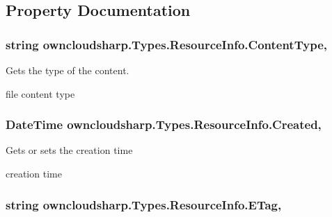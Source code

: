 \subsection{Property Documentation}
\hypertarget{classowncloudsharp_1_1_types_1_1_resource_info_a630004ab07e631b1b72a13388b2fb656}{}
\subsubsection[{Content\+Type}]{\setlength{\rightskip}{0pt plus 5cm}string owncloudsharp.\+Types.\+Resource\+Info.\+Content\+Type\hspace{0.3cm}{\ttfamily [get]}, {\ttfamily [set]}}\label{classowncloudsharp_1_1_types_1_1_resource_info_a630004ab07e631b1b72a13388b2fb656}


Gets the type of the content. 

file content type\hypertarget{classowncloudsharp_1_1_types_1_1_resource_info_a663b8a81ceec10d43e82892f792e256c}{}
\subsubsection[{Created}]{\setlength{\rightskip}{0pt plus 5cm}Date\+Time owncloudsharp.\+Types.\+Resource\+Info.\+Created\hspace{0.3cm}{\ttfamily [get]}, {\ttfamily [set]}}\label{classowncloudsharp_1_1_types_1_1_resource_info_a663b8a81ceec10d43e82892f792e256c}


Gets or sets the creation time 

creation time\hypertarget{classowncloudsharp_1_1_types_1_1_resource_info_ae4e1ffb22dbd826289cada284e9b4a78}{}
\subsubsection[{E\+Tag}]{\setlength{\rightskip}{0pt plus 5cm}string owncloudsharp.\+Types.\+Resource\+Info.\+E\+Tag\hspace{0.3cm}{\ttfamily [get]}, {\ttfamily [set]}}\label{classowncloudsharp_1_1_types_1_1_resource_info_ae4e1ffb22dbd826289cada284e9b4a78}


